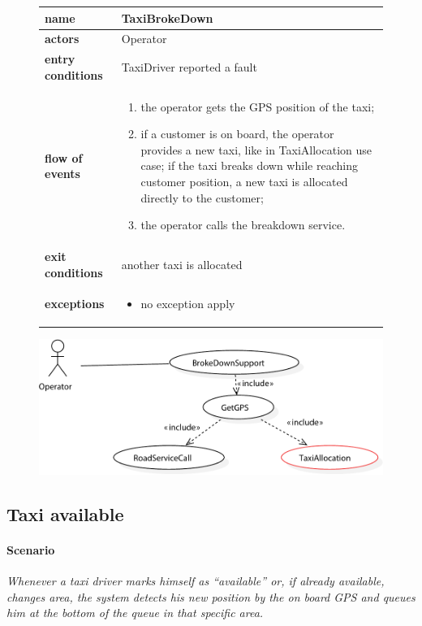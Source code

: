 \begin{figure}\begin{tabularx}{\textwidth}{ >{\bfseries}l X }\toprule%
	name				&	TaxiBrokeDown%
	\\ \midrule%
	actors				&	Operator%
	\\ \midrule%
	entry conditions	&	TaxiDriver reported a fault%
	\\ \midrule%
	flow of events		&	\begin{enumerate}%
		\item the operator gets the GPS position of the taxi;%
		\item if a customer is on board, the operator provides a new taxi, like in TaxiAllocation use case; if the taxi breaks down while reaching customer position, a new taxi is allocated directly to the customer;%
		\item the operator calls the breakdown service.%
	\end{enumerate} \\ \midrule%
	exit conditions		&	another taxi is allocated%
		\\ \midrule%
	exceptions			&	\begin{itemize}%
		\item no exception apply%
	\end{itemize}\\ \bottomrule%
\end{tabularx}\end{figure}


\begin{figure}%
	\includegraphics[width=\textwidth]{img/U_TaxiBrokeDown}%
\end{figure}
	

\subsection{Taxi available}

\paragraph{Scenario}{\small\itshape Whenever a taxi driver marks himself as ``available'' or, if already available, changes area, the system detects his new position by the on board GPS and queues him at the bottom of the queue in that specific area.}


